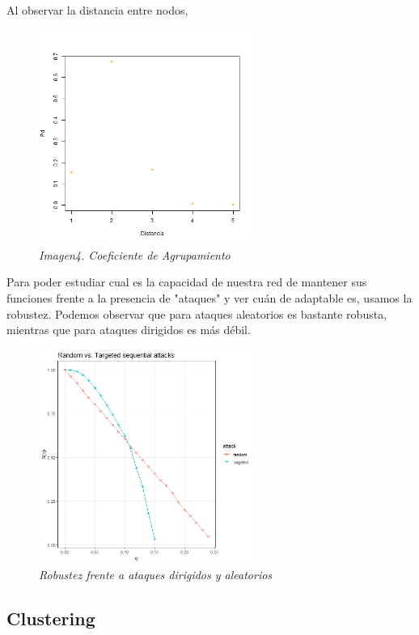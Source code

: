 Al observar la distancia entre nodos, 
\begin{figure}
	\centering
	
	\includegraphics[width=70mm,scale=1.2]{figures/distancia.png}
	
	\caption{\textit{Imagen4. Coeficiente de Agrupamiento}}
	
\end{figure}

Para poder estudiar cual es la capacidad de nuestra red de mantener sus funciones frente a la presencia de "ataques" y ver cuán de adaptable es, usamos la robustez. Podemos observar que para ataques aleatorios es bastante robusta, mientras que para ataques dirigidos es más débil. 

\begin{figure}
	\centering
		\includegraphics[width=70mm,scale=1.2]{figures/sequential_attacks.png}
		\caption{\textit{Robustez frente a ataques dirigidos y aleatorios}}
\end{figure}

\subsection{Clustering}




